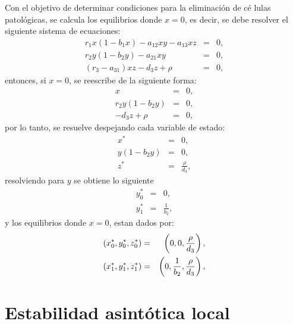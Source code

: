\documentclass[letterpaper,11pt]{article}
\begin{document}
Con el objetivo de determinar condiciones para la eliminaci\'{o}n de c\'{e}%
lulas patol\'{o}gicas, se calcula los equilibrios donde $x=0$, es decir, se
debe resolver el siguiente sistema de ecuaciones:%
\begin{eqnarray*}
r_{1}x\left( 1-b_{1}x\right) -a_{12}xy-a_{13}xz &=&0, \\
r_{2}y\left( 1-b_{2}y\right) -a_{21}xy &=&0, \\
\left( r_{3}-a_{31}\right) xz-d_{3}z+\rho &=&0,
\end{eqnarray*}%
entonces, si $x=0$, se reescribe de la siguiente forma:%
\begin{eqnarray*}
x &=&0, \\
r_{2}y\left( 1-b_{2}y\right) &=&0, \\
-d_{3}z+\rho &=&0,
\end{eqnarray*}%
por lo tanto, se resuelve despejando cada variable de estado:%
\begin{eqnarray*}
x^{\ast } &=&0, \\
y\left( 1-b_{2}y\right) &=&0, \\
z^{\ast } &=&\frac{\rho }{d_{3}},
\end{eqnarray*}%
resolviendo para $y$ se obtiene lo siguiente%
\begin{eqnarray*}
y_{0}^{\ast } &=&0, \\
y_{1}^{\ast } &=&\frac{1}{b_{2}},
\end{eqnarray*}%
y los equilibrios donde $x=0$, estan dados por:%
\begin{eqnarray*}
\left( x_{0}^{\ast },y_{0}^{\ast },z_{0}^{\ast }\right) &=&\left( 0,0,\frac{%
\rho }{d_{3}}\right) , \\
\left( x_{1}^{\ast },y_{1}^{\ast },z_{1}^{\ast }\right) &=&\left( 0,\frac{1}{%
b_{2}},\frac{\rho }{d_{3}}\right) ,
\end{eqnarray*}

\section{Estabilidad asint\'{o}tica local}
\end{document}
